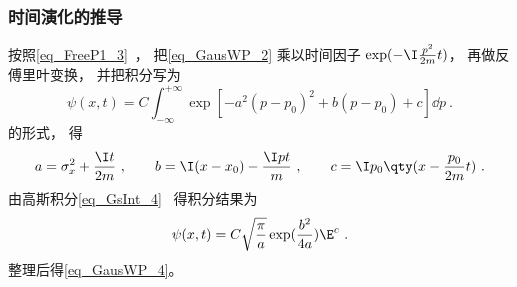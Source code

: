 \subsubsection{时间演化的推导}
按照\autoref{eq_FreeP1_3}~， 把\autoref{eq_GausWP_2} 乘以时间因子 $\exp(-\I \frac{p^2}{2m}t)$， 再做反傅里叶变换， 并把积分写为
\begin{equation}
\psi(x, t) = C\int_{-\infty}^{+\infty} \exp[-a^2(p-p_0)^2 + b(p-p_0) + c] \dd{p}~.
\end{equation}
的形式， 得
\begin{equation}
a = \sigma_x^2 + \frac{\I t}{2m}~, \qquad
b = \I(x-x_0) - \frac{\I pt}{m}~, \qquad
c = \I p_0 \qty(x - \frac{p_0}{2m} t)~.
\end{equation}
由高斯积分\autoref{eq_GsInt_4}~ 得积分结果为
\begin{equation}
\psi(x, t) = C\sqrt{\frac{\pi}{a}} \exp(\frac{b^2}{4a})\E^c~.
\end{equation}
整理后得\autoref{eq_GausWP_4}。
